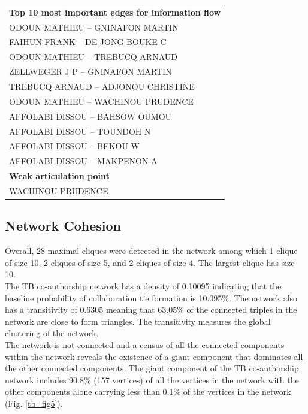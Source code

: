 \begin{table}[h!]
\begin{tabular}{l}
\hline
\textbf{Top 10 most important edges for information flow}\\
\hspace{20pt}ODOUN MATHIEU -- GNINAFON MARTIN\\
\hspace{20pt}FAIHUN FRANK -- DE JONG BOUKE C\\
\hspace{20pt}ODOUN MATHIEU -- TREBUCQ ARNAUD\\
\hspace{20pt}ZELLWEGER J P -- GNINAFON MARTIN\\
\hspace{20pt}TREBUCQ ARNAUD -- ADJONOU CHRISTINE\\
\hspace{20pt}ODOUN MATHIEU -- WACHINOU PRUDENCE\\
\hspace{20pt}AFFOLABI DISSOU -- BAHSOW OUMOU\\
\hspace{20pt}AFFOLABI DISSOU -- TOUNDOH N\\
\hspace{20pt}AFFOLABI DISSOU -- BEKOU W\\      
\hspace{20pt}AFFOLABI DISSOU -- MAKPENON A\\
\hline
\textbf{Weak articulation point}\\
\hspace{20pt}WACHINOU PRUDENCE\\
\bottomrule
\end{tabular}
\end{table}

\subsection{Network Cohesion}
Overall, 28 maximal cliques were detected in the network among which 1 clique of size 10, 2 cliques of size 5, and 2 cliques of size 4. The largest clique has size 10. \\
The TB co-authorship network has a density of 0.10095 indicating that the baseline probability of collaboration tie formation is 10.095\%. The network also has a transitivity of 0.6305 meaning that 63.05\% of the connected triples in the network are close to form triangles. The transitivity measures the global clustering of the network.\\
The network is not connected and a census of all the connected components within the network reveals the existence of a giant component that dominates all the other connected components. The giant component of the TB co-authorship network includes 90.8\% (157 vertices) of all the vertices in the network with the other components alone carrying less than 0.1\% of the vertices in the network (Fig. \ref{tb_fig5}). 

